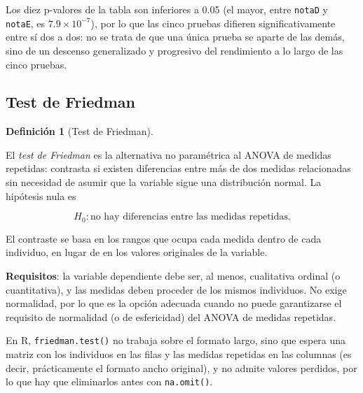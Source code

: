 \documentclass[
  spanish,
  a4paper,
]{scrreport}
\theoremstyle{definition}
\theoremstyle{definition}
\newtheorem{definition}{Definición}[chapter]
\theoremstyle{remark}
\begin{document}
Los diez p-valores de la tabla son inferiores a 0.05 (el mayor, entre
\texttt{notaD} y \texttt{notaE}, es \(7.9\times10^{-7}\)), por lo que
las cinco pruebas difieren significativamente entre sí dos a dos: no se
trata de que una única prueba se aparte de las demás, sino de un
descenso generalizado y progresivo del rendimiento a lo largo de las
cinco pruebas.

\subsection{Test de Friedman}\label{test-de-friedman}

\begin{definition}[Test de
Friedman]\protect\hypertarget{def-medidasrepetidas-friedman}{}\label{def-medidasrepetidas-friedman}

El \emph{test de Friedman} es la alternativa no paramétrica al ANOVA de
medidas repetidas: contrasta si existen diferencias entre más de dos
medidas relacionadas sin necesidad de asumir que la variable sigue una
distribución normal. La hipótesis nula es

\[H_0: \mbox{no hay diferencias entre las medidas repetidas.}\]

El contraste se basa en los rangos que ocupa cada medida dentro de cada
individuo, en lugar de en los valores originales de la variable.

\end{definition}

\textbf{Requisitos}: la variable dependiente debe ser, al menos,
cualitativa ordinal (o cuantitativa), y las medidas deben proceder de
los mismos individuos. No exige normalidad, por lo que es la opción
adecuada cuando no puede garantizarse el requisito de normalidad (o de
esfericidad) del ANOVA de medidas repetidas.

En R, \texttt{friedman.test()} no trabaja sobre el formato largo, sino
que espera una matriz con los individuos en las filas y las medidas
repetidas en las columnas (es decir, prácticamente el formato ancho
original), y no admite valores perdidos, por lo que hay que eliminarlos
antes con \texttt{na.omit()}.
\end{document}
